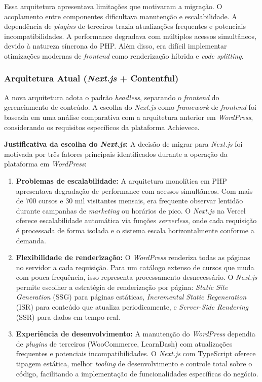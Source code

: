 Essa arquitetura apresentava limitações que motivaram a migração. O acoplamento entre componentes dificultava manutenção e escalabilidade. A dependência de \textit{plugins} de terceiros trazia atualizações frequentes e potenciais incompatibilidades. A performance degradava com múltiplos acessos simultâneos, devido à natureza síncrona do PHP. Além disso, era difícil implementar otimizações modernas de \textit{frontend} como renderização híbrida e \textit{code splitting}.

\subsubsection{Arquitetura Atual (\textit{Next.js} + Contentful)}

A nova arquitetura adota o padrão \textit{headless}, separando o \textit{frontend} do gerenciamento de conteúdo. A escolha do \textit{Next.js} como \textit{framework} de \textit{frontend} foi baseada em uma análise comparativa com a arquitetura anterior em \textit{WordPress}, considerando os requisitos específicos da plataforma Achievece.

\textbf{Justificativa da escolha do \textit{Next.js}:} A decisão de migrar para \textit{Next.js} foi motivada por três fatores principais identificados durante a operação da plataforma em \textit{WordPress}:

\begin{enumerate}
    \item \textbf{Problemas de escalabilidade:} A arquitetura monolítica em PHP apresentava degradação de performance com acessos simultâneos. Com mais de 700 cursos e 30 mil visitantes mensais, era frequente observar lentidão durante campanhas de \textit{marketing} ou horários de pico. O \textit{Next.js} na Vercel oferece escalabilidade automática via funções \textit{serverless}, onde cada requisição é processada de forma isolada e o sistema escala horizontalmente conforme a demanda.

    \item \textbf{Flexibilidade de renderização:} O \textit{WordPress} renderiza todas as páginas no servidor a cada requisição. Para um catálogo extenso de cursos que muda com pouca frequência, isso representa processamento desnecessário. O \textit{Next.js} permite escolher a estratégia de renderização por página: \textit{Static Site Generation} (SSG) para páginas estáticas, \textit{Incremental Static Regeneration} (ISR) para conteúdo que atualiza periodicamente, e \textit{Server-Side Rendering} (SSR) para dados em tempo real.

    \item \textbf{Experiência de desenvolvimento:} A manutenção do \textit{WordPress} dependia de \textit{plugins} de terceiros (WooCommerce, LearnDash) com atualizações frequentes e potenciais incompatibilidades. O \textit{Next.js} com TypeScript oferece tipagem estática, melhor \textit{tooling} de desenvolvimento e controle total sobre o código, facilitando a implementação de funcionalidades específicas do negócio.
\end{enumerate}

